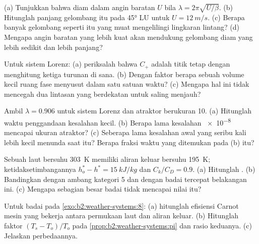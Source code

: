 \begin{exercise}[$\star\star$]\label{exo:b2:weather-systems:5}
(a) Tunjukkan bahwa  diam dalam angin baratan $U$ bila $\lambda = 2\pi\sqrt{U/\beta}$.
(b) Hitunglah panjang gelombang itu pada \ang{45} LU untuk $U = \qty{12}{m/s}$. (c) Berapa banyak gelombang seperti itu yang muat mengelilingi
lingkaran lintang? (d) Mengapa angin baratan yang lebih kuat akan mendukung gelombang diam yang lebih sedikit dan lebih panjang?
\end{exercise}

\begin{exercise}[$\star\star$]\label{exo:b2:weather-systems:6}
Untuk sistem Lorenz: (a) periksalah bahwa $C_+$ adalah titik tetap dengan menghitung ketiga turunan
di sana. (b) Dengan faktor berapa sebuah volume kecil ruang fase menyusut dalam satu satuan waktu? (c) Mengapa
hal ini tidak mencegah dua lintasan yang berdekatan untuk saling menjauh?
\end{exercise}

\begin{exercise}[$\star\star$]\label{exo:b2:weather-systems:7}
Ambil $\lambda = 0.906$ untuk sistem Lorenz dan atraktor berukuran 10. (a) Hitunglah
waktu penggandaan kesalahan kecil. (b) Berapa lama kesalahan \num{e-8} mencapai ukuran
atraktor? (c) Seberapa lama kesalahan awal yang seribu kali lebih kecil menunda saat itu? Berapa
fraksi waktu yang ditemukan pada (b) itu?
\end{exercise}

\begin{exercise}[$\star\star$]\label{exo:b2:weather-systems:8}
Sebuah laut bersuhu \qty{303}{K} memiliki aliran keluar bersuhu \qty{195}{K}; ketidaksetimbangannya $h_o^* - h^* =
\qty{15}{kJ/kg}$ dan $C_k/C_D = 0.9$. (a) Hitunglah . (b) Bandingkan dengan
ambang kategori 5 dan dengan badai tercepat belakangan ini. (c) Mengapa sebagian besar badai tidak mencapai
nilai itu?
\end{exercise}

\begin{exercise}[$\star\star$]\label{exo:b2:weather-systems:9}
Untuk badai pada \cref{exo:b2:weather-systems:8}: (a) hitunglah efisiensi Carnot mesin yang
bekerja antara permukaan laut dan aliran keluar. (b) Hitunglah faktor $(T_s - T_o)/T_o$ pada
\cref{prop:b2:weather-systems:pi} dan rasio keduanya. (c) Jelaskan perbedaannya.
\end{exercise}

